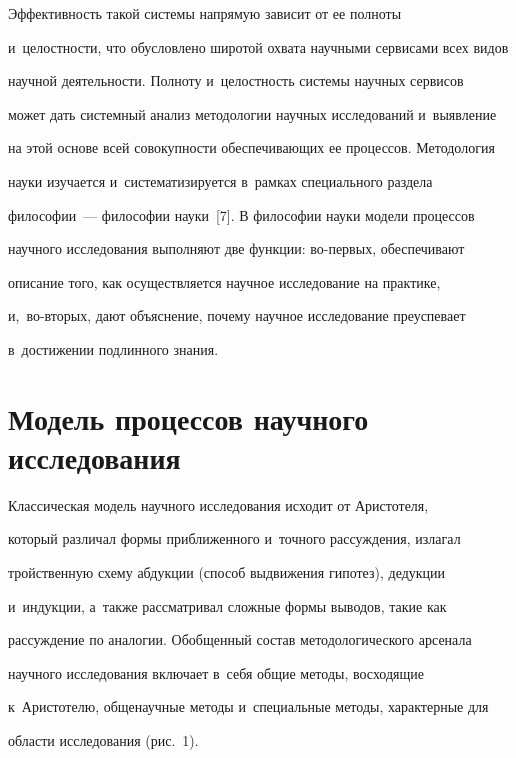     Эффективность такой системы напрямую зависит от ее полноты 

    и~целост\-ности, что обусловлено широтой охвата научными сервисами всех видов 

научной деятельности. Полноту и~целостность системы научных сервисов 

может дать сис\-тем\-ный анализ методологии научных исследований и~выявление 

на этой основе всей совокупности обеспечивающих ее процессов. Методология 

науки изучается и~систематизируется в~рамках специального раздела 

философии~--- философии науки~[7]. В философии науки модели процессов 

научного исследования выполняют две функции: во-пер\-вых, обеспечивают 

описание того, как осуществляется научное исследование на практике,  

и,~во-вто\-рых, дают объяснение, почему научное исследование преуспевает 

в~достижении подлинного знания.



\pagebreak



\section{Модель процессов научного исследования}



    Классическая модель научного исследования исходит от Аристотеля, 

который различал формы приближенного и~точного рассуждения, излагал 

тройственную схему абдукции (способ выдвижения гипотез), дедукции 

и~индукции, а~также рассматривал сложные формы выводов, такие как 

рассуждение по аналогии. Обобщенный состав методологического арсенала 

научного исследования включает в~себя общие методы, восходящие 

к~Аристотелю, общенаучные методы и~специальные методы, характерные для 

области исследования (рис.~1).

    



